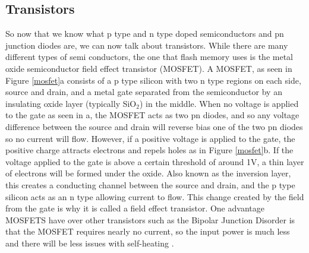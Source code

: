 \documentclass[ notitlepage, numerical, 11pt]{revtex4-1} %
\begin{document}
\subsection{Transistors}
So now that we know what p type and n type doped semiconductors and pn junction diodes are, we can now talk about transistors. While there are many different types of semi conductors, the one that flash memory uses is the metal oxide semiconductor field effect transistor (MOSFET). A MOSFET, as seen in Figure \ref{mosfet}a consists of a p type silicon with two n type regions on each side, source and drain, and a metal gate separated from the semiconductor by an insulating oxide layer (typically SiO$_2$) in the middle. When no voltage is applied to the gate as seen in a, the MOSFET acts as two pn diodes, and so any voltage difference between the source and drain will reverse bias one of the two pn diodes so no current will flow. However, if a positive voltage is applied to the gate, the positive charge attracts electrons and repels holes as in Figure \ref{mosfet}b. If the voltage applied to the gate is above a certain threshold of around 1V, a thin layer of electrons will be formed under the oxide. Also known as the inversion layer, this creates a conducting channel between the source and drain, and the p type silicon acts as an n type allowing current to flow. This change created by the field from the gate is why it is called a field effect transistor. One advantage MOSFETS have over other transistors such as the Bipolar Junction Disorder is that the MOSFET requires nearly no current, so the input power is much less and there will be less issues with self-heating \cite{modernPhysics}.
\end{document}
